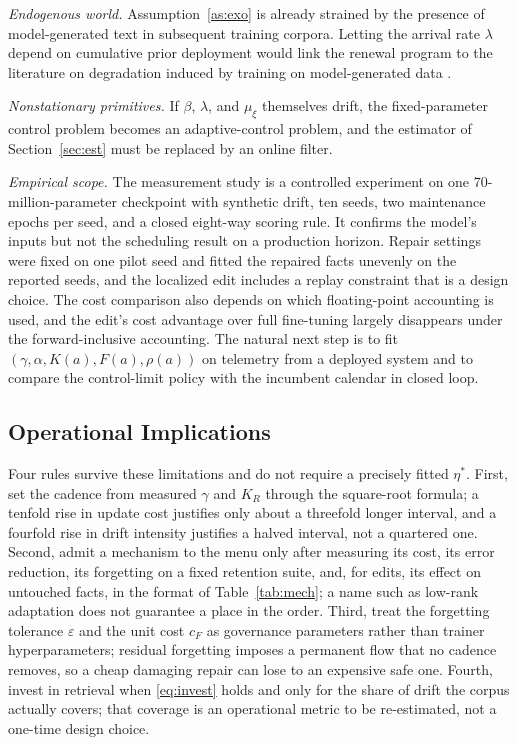 \documentclass[journal]{IEEEtran}
\newcommand{\eps}{\varepsilon}
\begin{document}
\emph{Endogenous world.} Assumption~\ref{as:exo} is already strained by the presence of model-generated text in subsequent training corpora. Letting the arrival rate $\lambda$ depend on cumulative prior deployment would link the renewal program to the literature on degradation induced by training on model-generated data \cite{shumailov2024}.

\emph{Nonstationary primitives.} If $\beta$, $\lambda$, and $\mu_\xi$ themselves drift, the fixed-parameter control problem becomes an adaptive-control problem, and the estimator of Section~\ref{sec:est} must be replaced by an online filter.

\emph{Empirical scope.} The measurement study is a controlled experiment on one 70-million-parameter checkpoint with synthetic drift, ten seeds, two maintenance epochs per seed, and a closed eight-way scoring rule. It confirms the model's inputs but not the scheduling result on a production horizon. Repair settings were fixed on one pilot seed and fitted the repaired facts unevenly on the reported seeds, and the localized edit includes a replay constraint that is a design choice. The cost comparison also depends on which floating-point accounting is used, and the edit's cost advantage over full fine-tuning largely disappears under the forward-inclusive accounting. The natural next step is to fit $(\gamma,\alpha,K(a),F(a),\rho(a))$ on telemetry from a deployed system and to compare the control-limit policy with the incumbent calendar in closed loop.

\subsection{Operational Implications}
Four rules survive these limitations and do not require a precisely fitted $\eta^\ast$. First, set the cadence from measured $\gamma$ and $K_R$ through the square-root formula; a tenfold rise in update cost justifies only about a threefold longer interval, and a fourfold rise in drift intensity justifies a halved interval, not a quartered one. Second, admit a mechanism to the menu only after measuring its cost, its error reduction, its forgetting on a fixed retention suite, and, for edits, its effect on untouched facts, in the format of Table~\ref{tab:mech}; a name such as low-rank adaptation does not guarantee a place in the order. Third, treat the forgetting tolerance $\eps$ and the unit cost $c_F$ as governance parameters rather than trainer hyperparameters; residual forgetting imposes a permanent flow that no cadence removes, so a cheap damaging repair can lose to an expensive safe one. Fourth, invest in retrieval when \eqref{eq:invest} holds and only for the share of drift the corpus actually covers; that coverage is an operational metric to be re-estimated, not a one-time design choice.
\end{document}
